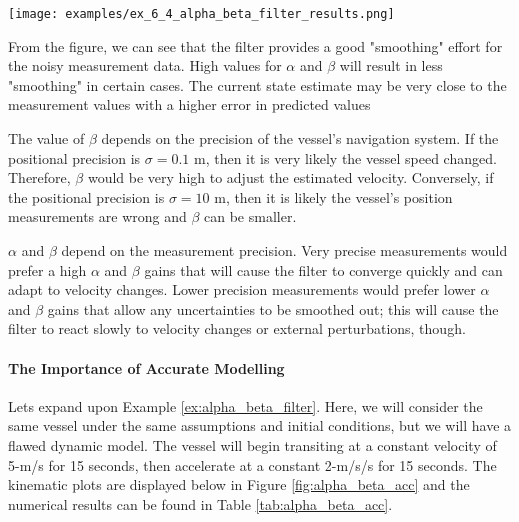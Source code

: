 \begin{example}
\begin{center}
\begin{tabular}{c | c | c | c | c | c}
            \bottomrule
            \end{tabular}
        \end{center}

        \begin{center}
            \texttt{[image: examples/ex\_6\_4\_alpha\_beta\_filter\_results.png]}
        \end{center}

        From the figure, we can see that the filter provides a good "smoothing" effort for the noisy measurement data.
        High values for $\alpha$ and $\beta$ will result in less "smoothing" in certain cases.
        The current state estimate may be very close to the measurement values with a higher error in predicted values

        The value of $\beta$ depends on the precision of the vessel's navigation system.
        If the positional precision is $\sigma = 0.1 \text{ m}$, then it is very likely the vessel speed changed.
        Therefore, $\beta$ would be very high to adjust the estimated velocity.
        Conversely, if the positional precision is $\sigma = 10 \text{ m}$, then it is likely the vessel's position measurements are wrong and $\beta$ can be smaller.

        $\alpha$ and $\beta$ depend on the measurement precision.
        Very precise measurements would prefer a high $\alpha$ and $\beta$ gains that will cause the filter to converge quickly and can adapt to velocity changes.
        Lower precision measurements would prefer lower $\alpha$ and $\beta$ gains that allow any uncertainties to be smoothed out; this will cause the filter to react slowly to velocity changes or external perturbations, though.
        
        \end{example}


        \paragraph{The Importance of Accurate Modelling} Lets expand upon Example \ref{ex:alpha_beta_filter}.
        Here, we will consider the same vessel under the same assumptions and initial conditions, but we will have a flawed dynamic model.
        The vessel will begin transiting at a constant velocity of 5-m/s for 15 seconds, then accelerate at a constant 2-m/s/s for 15 seconds.
        The kinematic plots are displayed below in Figure \ref{fig:alpha_beta_acc} and the numerical results can be found in Table \ref{tab:alpha_beta_acc}.

